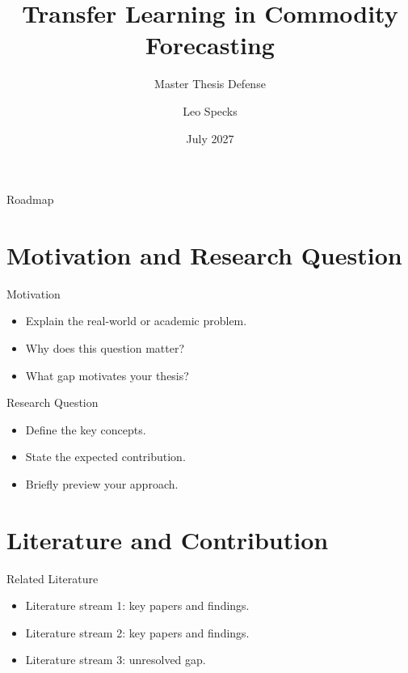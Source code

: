 \documentclass[aspectratio=169]{beamer}
\title[Transfer Learning in Commodity Forecasting]{Transfer Learning in Commodity Forecasting}
\subtitle{Master Thesis Defense}
\author[Leo Specks]{Leo Specks}
\institute{Bocconi University}
\date{July 2027}
\begin{document}
\begin{frame}
  \titlepage
\end{frame}

\begin{frame}{Roadmap}
  \tableofcontents
\end{frame}

\section{Motivation and Research Question}

\begin{frame}{Motivation}
  \begin{itemize}
    \item Explain the real-world or academic problem.
    \item Why does this question matter?
    \item What gap motivates your thesis?
  \end{itemize}

\end{frame}

\begin{frame}{Research Question}

  \begin{itemize}
    \item Define the key concepts.
    \item State the expected contribution.
    \item Briefly preview your approach.
  \end{itemize}
\end{frame}

\section{Literature and Contribution}

\begin{frame}{Related Literature}
  \begin{itemize}
    \item Literature stream 1: key papers and findings.
    \item Literature stream 2: key papers and findings.
    \item Literature stream 3: unresolved gap.
  \end{itemize}
\end{frame}
\end{document}
